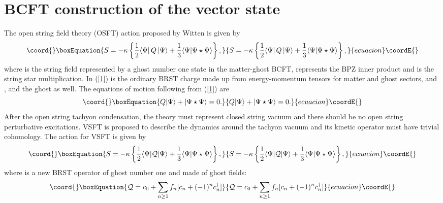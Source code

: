 \documentclass[a4paper,12pt]{article}
\begin{document}
\section{BCFT construction of the vector state}

The open string field theory (OSFT) action proposed by Witten is given by
\cite{w}
\begin{equation}\coord{}\boxEquation{
S=-\kappa\left\{\frac 12\langle\Psi|\,Q\,|\Psi\rangle+\frac 13
\langle\Psi|\Psi\star\Psi\rangle\right\},
\label{1}
}{
S=-\kappa\left\{\frac 12\langle\Psi|\,Q\,|\Psi\rangle+\frac 13
\langle\Psi|\Psi\star\Psi\rangle\right\},
}{ecuacion}\coordE{}\end{equation}
where \myHighlight{$|\Psi\rangle$}\coordHE{} is the string field represented by a ghost number one
state in the matter-ghost BCFT, \myHighlight{$\langle\cdot |\cdot \rangle$}\coordHE{} represents the
BPZ inner product and \myHighlight{$\star$}\coordHE{} is the string star multiplication. In
(\ref{1}) \coordHE{} is the ordinary BRST charge made up from 
energy-momentum tensors for matter and ghost sectors, \coordHE{} and
\coordHE{}, and the ghost as well. The equations of motion following from
(\ref{1}) are
\begin{equation}\coord{}\boxEquation{
Q|\Psi\rangle+|\Psi\star\Psi\rangle=0.
\label{2}
}{
Q|\Psi\rangle+|\Psi\star\Psi\rangle=0.
}{ecuacion}\coordE{}\end{equation}
After the open string tachyon condensation, the theory must represent closed 
string vacuum and there should be no open string perturbative excitations.
VSFT is proposed to describe the dynamics around the tachyon vacuum and
its kinetic operator \coordHE{} must have trivial cohomology. 
The action for VSFT is given by
\begin{equation}\coord{}\boxEquation{
S=-\kappa\left\{\frac 12\langle\Psi|
\mathcal{Q}|\Psi\rangle+\frac 13
\langle\Psi|\Psi\star\Psi\rangle\right\},
\label{3}
}{
S=-\kappa\left\{\frac 12\langle\Psi|
\mathcal{Q}|\Psi\rangle+\frac 13
\langle\Psi|\Psi\star\Psi\rangle\right\},
}{ecuacion}\coordE{}\end{equation}
where \coordHE{} is a new BRST operator of ghost number one and 
made of ghost fields:
\begin{equation}\coord{}\boxEquation{
\mathcal{Q}=c_0+\sum\limits_{n\geq 1}f_n[c_n+(-1)^nc^\dagger_n]
\label{4}
}{
\mathcal{Q}=c_0+\sum\limits_{n\geq 1}f_n[c_n+(-1)^nc^\dagger_n]
}{ecuacion}\coordE{}\end{equation}
\end{document}
